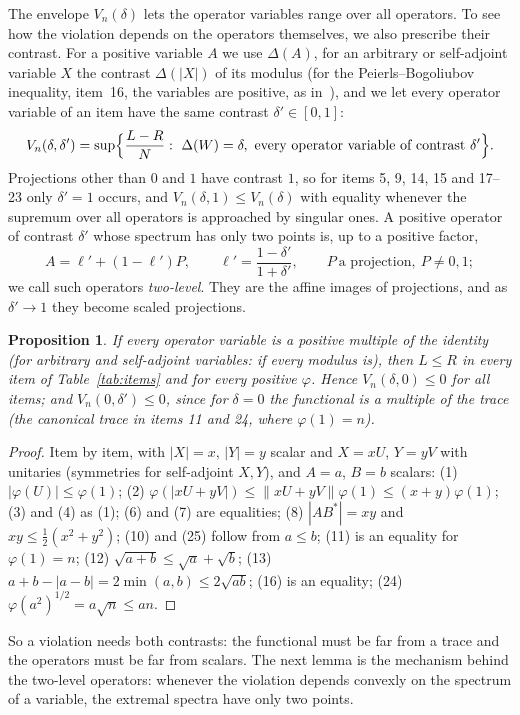 \documentclass[11pt]{article}
\theoremstyle{plain}
\newtheorem{proposition}[theorem]{Proposition}
\theoremstyle{definition}
\theoremstyle{remark}
\begin{document}
The envelope $V_n(\delta)$ lets the operator variables range over all operators. To see how the violation depends on
the operators themselves, we also prescribe their contrast. For a positive variable $A$ we use $\Delta(A)$, for an
arbitrary or self-adjoint variable $X$ the contrast $\Delta(|X|)$ of its modulus (for the Peierls--Bogoliubov
inequality, item~16, the variables are positive, as in~\cite{bikchentaev2011pb}), and we let every operator variable of
an item have the same contrast $\delta'\in[0,1]$:
\[
  V_n(\delta,\delta')=\sup\Bigl\{\frac{L-R}N:\ \Delta(W)=\delta,\ \text{every operator variable of contrast }\delta'\Bigr\}.
\]
Projections other than $0$ and $1$ have contrast $1$, so for items 5, 9, 14, 15 and 17--23 only $\delta'=1$ occurs, and
$V_n(\delta,1)\le V_n(\delta)$ with equality whenever the supremum over all operators is approached by singular ones.
A positive operator of contrast $\delta'$ whose spectrum has only two points is, up to a positive factor,
\[
  A=\ell'+(1-\ell')P,\qquad \ell'=\frac{1-\delta'}{1+\delta'},\qquad P\ \text{a projection},\ P\ne0,1;
\]
we call such operators \emph{two-level}. They are the affine images of projections, and as $\delta'\to1$ they become
scaled projections.

\begin{proposition}\label{prop:scalar}
If every operator variable is a positive multiple of the identity (for arbitrary and self-adjoint variables: if every
modulus is), then $L\le R$ in every item of Table~\ref{tab:items} and for every positive $\varphi$. Hence
$V_n(\delta,0)\le0$ for all items; and $V_n(0,\delta')\le0$, since for $\delta=0$ the functional is a multiple of the trace
(the canonical trace in items 11 and 24, where $\varphi(1)=n$).
\end{proposition}
\begin{proof}
Item by item, with $|X|=x$, $|Y|=y$ scalar and $X=xU$, $Y=yV$ with unitaries (symmetries for self-adjoint $X,Y$), and
$A=a$, $B=b$ scalars: (1) $|\varphi(U)|\le\varphi(1)$; (2) $\varphi(|xU+yV|)\le\|xU+yV\|\varphi(1)\le(x+y)\varphi(1)$; (3) and (4)
as (1); (6) and (7) are equalities; (8) $|AB^*|=xy$ and $xy\le\frac12(x^2+y^2)$; (10) and (25) follow from $a\le b$; (11) is an
equality for $\varphi(1)=n$; (12) $\sqrt{a+b}\le\sqrt a+\sqrt b$; (13) $a+b-|a-b|=2\min(a,b)\le2\sqrt{ab}$; (16) is an equality;
(24) $\varphi(a^2)^{1/2}=a\sqrt n\le an$.
\end{proof}

So a violation needs both contrasts: the functional must be far from a trace and the operators must be far from scalars.
The next lemma is the mechanism behind the two-level operators: whenever the violation depends convexly on the spectrum of a
variable, the extremal spectra have only two points.
\end{document}
